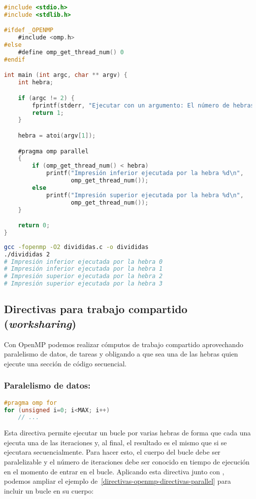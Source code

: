 \begin{lstlisting}[language=C]
#include <stdio.h>
#include <stdlib.h>

#ifdef _OPENMP
	#include <omp.h>
#else
	#define omp_get_thread_num() 0
#endif

int main (int argc, char ** argv) {
	int hebra;

	if (argc != 2) {
		fprintf(stderr, "Ejecutar con un argumento: El número de hebras.\n");
		return 1;
	}

	hebra = atoi(argv[1]);

	#pragma omp parallel
	{
		if (omp_get_thread_num() < hebra)
			printf("Impresión inferior ejecutada por la hebra %d\n",
			       omp_get_thread_num());
		else
			printf("Impresión superior ejecutada por la hebra %d\n",
			       omp_get_thread_num());
	}

	return 0;
}
\end{lstlisting}

\begin{lstlisting}[language=sh]
gcc -fopenmp -O2 divididas.c -o divididas
./divididas 2
# Impresión inferior ejecutada por la hebra 0
# Impresión inferior ejecutada por la hebra 1
# Impresión superior ejecutada por la hebra 2
# Impresión superior ejecutada por la hebra 3
\end{lstlisting}

\subsection{Directivas para trabajo compartido (\textit{worksharing})}\label{directivas-openmp-directivas-trabajo-compartido}

Con OpenMP podemos realizar cómputos de trabajo compartido aprovechando paralelismo de datos, de tareas y obligando a que sea una de las hebras quien ejecute una sección de código secuencial.

\subsubsection{Paralelismo de datos: }

\begin{lstlisting}[language=C]
#pragma omp for
for (unsigned i=0; i<MAX; i++)
	// ...
\end{lstlisting}

Esta directiva permite ejecutar un bucle  por varias hebras de forma que cada una ejecuta una de las iteraciones y, al final, el resultado es el mismo que si se ejecutara secuencialmente.
Para hacer esto, el cuerpo del bucle debe ser paralelizable y el número de iteraciones debe ser conocido en tiempo de ejecución en el momento de entrar en el bucle.
Aplicando esta directiva junto con , podemos ampliar el ejemplo de~\ref{directivas-openmp-directivas-parallel} para incluir un bucle en su cuerpo:

